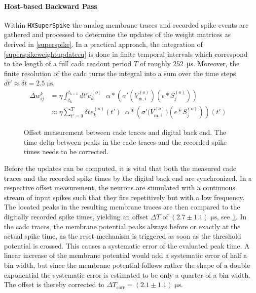 \paragraph{Host-based Backward Pass}
Within \texttt{HXSuperSpike} the analog membrane traces and recorded spike events are gathered and processed to determine the updates of the weight matrices as derived in \cref{superspike}. In a practical approach, the integration of \cref{superspikeweightupdateeq} is done in finite temporal intervals which correspond to the length of a full \gls{cadc} readout period $T$ of roughly \SI{252}{\micro \s}. Moreover, the finite resolution of the \gls{cadc} turns the integral into a sum over the time steps $dt'  \approx \delta t = \SI{2.5}{\micro \s}$.
\begin{align}
\Delta w^k_{ij} &= \eta \int_{t_k}^{t_{k+1}} dt'
e^{(o)}_k \; \; \alpha \ast 
\left( \sigma'(V^{(o)}_{\text{m},i}) \left(\epsilon \ast S^{(o)}_j\right) \right) \nonumber \\
&\approx \eta \sum_{t'=0}^{T} \delta t e^{(o)}_k(t') \; \; \alpha \ast 
\left( \sigma'\big(V^{(o)}_{\text{m},i}\big) \left(\epsilon \ast S^{(o)}_j\right)\right)(t')
\label{superspikeweightupdatedivided}
\end{align}

\begin{figure}
	\centering
	\vspace{-.75cm}
	
	\vspace{-.15cm}
	\caption[Offset measurement between \acrshort{cadc} traces and digital back end.]{Offset measurement between \acrshort{cadc} traces and digital back end. The time delta between peaks in the \acrshort{cadc} traces and the recorded spike times needs to be corrected.} 
	\label{cadcppuoffset}
	\vspace{-.75cm}
\end{figure}

Before the updates can be computed, it is vital that both the measured \acrshort{cadc} traces and the recorded spike times by the digital back end are synchronized. In a respective offset measurement, the neurons are stimulated with a continuous stream of input spikes such that they fire repetitively but with a low frequency. The located peaks in the resulting membrane traces are then compared to the digitally recorded spike times, yielding an offset $\Delta T$ of $(2.7 \pm 1.1)\; \si{\micro\s}$, see \cref{cadcppuoffset}. In the \gls{cadc} traces, the membrane potential peaks always before or exactly at the actual spike time, as the reset mechanism is triggered as soon as the threshold potential is crossed. This causes a systematic error of the evaluated peak time. A linear increase of the membrane potential would add a systematic error of half a bin width, but since the membrane potential follows rather the shape of a double exponential the systematic error is estimated to be only a quarter of a bin width. The offset is thereby corrected to $\Delta T_\text{corr} = (2.1 \pm 1.1)\; \si{\micro\s}$.

